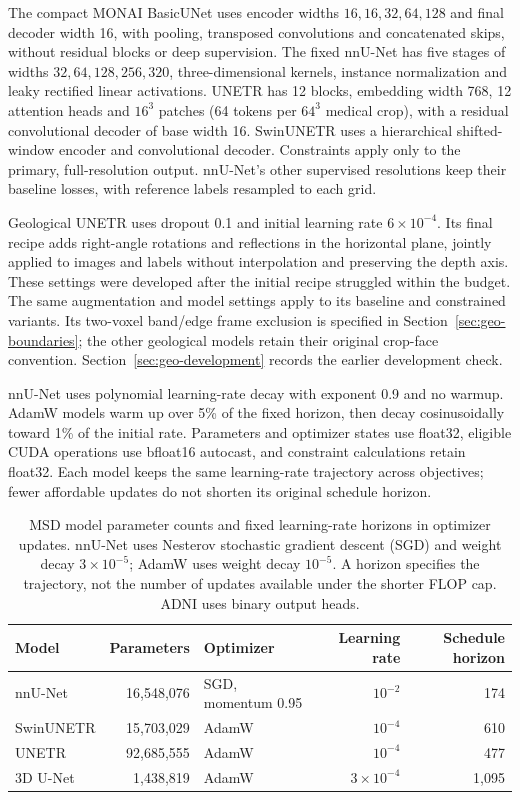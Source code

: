 \documentclass[12pt,a4paper]{article}
\begin{document}
The compact MONAI BasicUNet uses encoder widths $16,16,32,64,128$
and final decoder width 16, with pooling, transposed convolutions and
concatenated skips, without residual blocks or deep supervision.
The fixed nnU-Net has five stages of widths $32,64,128,256,320$,
three-dimensional kernels, instance normalization and leaky rectified
linear activations. UNETR has 12 blocks, embedding width 768, 12
attention heads and $16^3$ patches (64 tokens per $64^3$ medical crop),
with a residual convolutional decoder of base width 16. SwinUNETR
uses a hierarchical shifted-window encoder and convolutional decoder.
Constraints apply only to the primary, full-resolution output.
nnU-Net's other supervised resolutions keep their baseline losses, with
reference labels resampled to each grid.

Geological UNETR uses dropout 0.1 and initial learning rate
$6\times10^{-4}$. Its final recipe adds right-angle rotations and
reflections in the horizontal plane, jointly applied to images and
labels without interpolation and preserving the depth axis. These
settings were developed after the initial recipe struggled within the
budget. The same augmentation and model settings apply to its baseline
and constrained variants. Its two-voxel band/edge frame exclusion is
specified in Section~\ref{sec:geo-boundaries}; the other geological
models retain their original crop-face convention.
Section~\ref{sec:geo-development} records the earlier development check.

nnU-Net uses polynomial learning-rate decay with exponent 0.9 and no
warmup. AdamW models warm up over 5\% of the fixed horizon, then decay
cosinusoidally toward 1\% of the initial rate. Parameters and optimizer
states use float32, eligible CUDA operations use bfloat16 autocast,
and constraint calculations retain float32. Each model keeps the same
learning-rate trajectory across objectives; fewer affordable updates
do not shorten its original schedule horizon.

\begin{table}[htbp]
\centering\small{}
\begin{tabular}{@{}P{2.5cm}rP{3.0cm}rr@{}}
\hline
Model & Parameters & Optimizer & Learning rate & Schedule horizon \\
\hline
nnU-Net & 16,548,076 & SGD, momentum 0.95 & $10^{-2}$ & 174 \\
SwinUNETR & 15,703,029 & AdamW & $10^{-4}$ & 610 \\
UNETR & 92,685,555 & AdamW & $10^{-4}$ & 477 \\
3D U-Net & 1,438,819 & AdamW & $3\times10^{-4}$ & 1,095 \\
\hline
\end{tabular}
\caption{MSD model parameter counts and fixed learning-rate horizons in optimizer
updates. nnU-Net uses Nesterov stochastic gradient descent (SGD) and weight decay $3\times10^{-5}$;
AdamW uses weight decay $10^{-5}$. A horizon specifies the trajectory,
not the number of updates available under the shorter FLOP cap. ADNI
uses binary output heads.}
\label{tab:main-model-settings}
\end{table}
\end{document}
